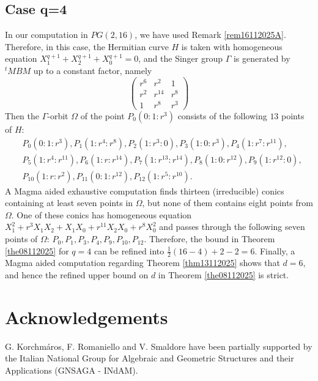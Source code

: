\documentclass[9pt]{article}
\theoremstyle{plain}
\begin{document}
\subsection{Case q=4} In our computation in $PG(2,16)$, we have used Remark \ref{rem16112025A}. Therefore, in this case, the Hermitian curve $H$ is taken with homogeneous equation   $X_1^{q+1}+X_2^{q+1}+X_0^{q+1}=0$, and 
the Singer group $\Gamma$ is generated by $^tMBM$ up to a constant factor, namely   
\[\left(\begin{array}{ccc} 
r^6  & r^{2}  & 1\\
r^{2}  & r^{14}  & r^{8} \\
 1 & r^{8} & r^3
\end{array}\right)\]
Then the $\Gamma$-orbit $\Omega$ of the point $P_0(0:1:r^3)$ consists of the following $13$ points of $H$:  
\begin{align*}
&P_0(0:1:r^3), P_1(1:r^4:r^8), P_2(1:r^3:0), P_3(1:0:r^3),
P_4(1:r^7:r^{11}),\\ 
&P_5(1:r^4:r^{11}), P_6(1:r:r^{14}), 
P_7(1:r^{13}:r^{14}), P_8(1:0:r^{12}), P_{9}(1:r^{12}:0),\\
&P_{10}(1:r:r^2), P_{11}(0:1:r^{12}), P_{12}(1:r^5:r^{10}). 
\end{align*}
A Magma aided exhaustive computation finds thirteen (irreducible) conics containing at least seven points in $\Omega$, but none of them contains eight points
from $\Omega$. One of these conics has homogeneous equation $X_1^2+r^3X_1X_2+X_1X_0+r^{11}X_2X_0+r^8 X_0^2$ and passes through the following seven points of $\Omega$: $P_0,P_1,P_3,P_4,P_9,P_{10},P_{12}$.  Therefore, the bound in Theorem \ref{the08112025} for $q=4$ can be refined into 
$\frac{1}{2}(16-4)+2-2=6$. Finally, a Magma aided computation regarding Theorem \ref{thm13112025} shows that $d=6$, and hence the refined upper bound on $d$ in Theorem \ref{the08112025} is strict.  





\section*{Acknowledgements} G. Korchm\'aros, F. Romaniello  and V. Smaldore   have been partially supported by the Italian National Group for Algebraic and Geometric Structures and their Applications (GNSAGA - INdAM).
\end{document}
